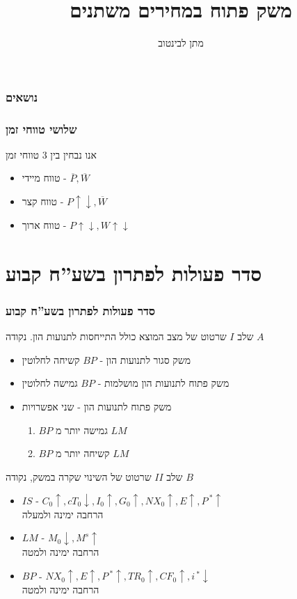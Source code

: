 \documentclass[10pt,usenames,dvipsnames]{beamer}
\title[]{משק פתוח במחירים משתנים}
\author{מתן לבינטוב}
\institute[{{ אב"ג}}]{{ אוניברסיטת בן גוריון בנגב}}
\date{}
\begin{document}
\begin{RTL}
\begin{frame}
\titlepage
\end{frame}
\begin{frame}
    \frametitle{נושאים}
    \tableofcontents
    

\end{frame}


\begin{frame}
    \frametitle{שלושי טווחי זמן}
    אנו נבחין בין 3 טווחי זמן
    \begin{itemize}
        \item טווח מיידי - $\overline{P} , \overline{W}$
        \item טווח קצר - $P \uparrow \downarrow, \overline{W}$
        \item טווח ארוך - $P \uparrow \downarrow, W \uparrow \downarrow$
    \end{itemize}

    

\end{frame}

\section{סדר פעולות לפתרון בשע''ח קבוע}
\begin{frame}[allowframebreaks]
    \frametitle{סדר פעולות לפתרון בשע''ח קבוע}
    \begin{block}{שלב $I$}
        שרטוט של מצב המוצא כולל התייחסות לתנועות הון. נקודה $A$
        \begin{itemize}
            \item משק סגור לתנועות הון - $BP$ קשיחה לחלוטין
            \item משק פתוח לתנועות הון מושלמות - $BP$ גמישה לחלוטין
            \item משק פתוח לתנועות הון - שני אפשרויות
            \begin{enumerate}
                \item $BP$ גמישה יותר מ $LM$
                \item $BP$ קשיחה יותר מ $LM$
            \end{enumerate}
        \end{itemize}
    \end{block}

    \begin{block}{שלב $II$}
        שרטוט של השינוי שקרה במשק, נקודה $B$
        \begin{itemize}
            \item $IS$ - $C_0 \uparrow ,cT_0 \downarrow ,I_0 \uparrow ,G_0 \uparrow ,NX_0 \uparrow ,E \uparrow ,P^{\ *} \uparrow$ \\ הרחבה ימינה ולמעלה
            \item $LM$ - $M_0 \downarrow , M^s \uparrow$ \\ הרחבה ימינה ולמטה
            \item $BP$ - $NX_0 \uparrow , E \uparrow , P^{\ *} \uparrow , TR_0 \uparrow, CF_0 \uparrow, i^{\ *} \downarrow$ \\ הרחבה ימינה ולמטה
        \end{itemize}
    \end{block}
    

\end{frame}
\end{RTL}
\end{document}
